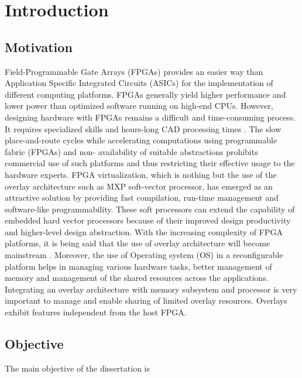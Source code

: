 \newpage

\chapter{Introduction}
\section{Motivation}
Field-Programmable Gate Arrays (FPGAs) provides an easier way than Application Specific Integrated Circuits (ASICs) for the implementation of different computing platforms. FPGAs generally yield higher performance and lower power than optimized software running on high-end CPUs. However, designing hardware with FPGAs remains a difficult and time-consuming process. It requires specialized skills and hours-long CAD processing times \cite{1}. The slow place-and-route cycles while accelerating computations using programmable fabric (FPGAs) and non- availability of suitable abstractions prohibits commercial use of such platforms and thus restricting their effective usage to the hardware experts. FPGA virtualization, which is nothing but the use of the overlay architecture such as MXP soft-vector processor, has emerged as an attractive solution by providing fast compilation, run-time management and software-like programmability. These soft processors can extend the capability of embedded hard vector processors because of their improved design productivity and higher-level design abstraction. With the increasing complexity of FPGA platforms, it is being said that the use of overlay architecture will become mainstream \cite{2}. Moreover, the use of Operating system (OS) in a reconfigurable platform helps in managing various hardware tasks, better management of memory and management of the shared resources across the applications. Integrating an overlay architecture with memory subsystem and processor is very important to manage and enable sharing of limited overlay resources. Overlays exhibit features independent from the host FPGA.




\section{Objective}
The main objective of the dissertation is

